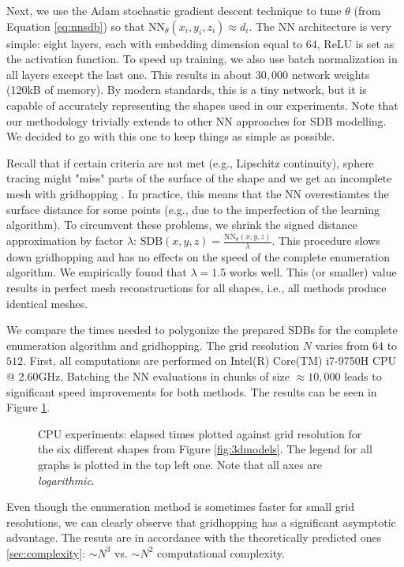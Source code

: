 \documentclass[11pt,twocolumn]{article}
\begin{document}
		Next, we use the Adam stochastic gradient descent technique to tune $\theta$ (from Equation \ref{eq:nnsdb}) so that $\text{NN}_\theta(x_i, y_i, z_i)\approx d_i$.
		The NN architecture is very simple: eight layers, each with embedding dimension equal to $64$, ReLU is set as the activation function.
		To speed up training, we also use batch normalization in all layers except the last one.
		This results in about $30,000$ network weights (120kB of memory).
		By modern standards, this is a tiny network, but it is capable of accurately representing the shapes used in our experiments.
		Note that our methodology trivially extends to other NN approaches for SDB modelling.
		We decided to go with this one to keep things as simple as possible.

		Recall that if certain criteria are not met (e.g., Lipschitz continuity),
		sphere tracing might "miss" parts of the surface of the shape and we get an incomplete mesh with gridhopping \cite{Hart94spheretracing}.
		In practice, this means that the NN overestiamtes the surface distance for some points
		(e.g., due to the imperfection of the learning algorithm).
		To circumvent these problems, we shrink the signed distance approximation by factor $\lambda$: $\text{SDB}(x, y, z)=\frac{\text{NN}_\theta(x, y, z)}{\lambda}$.
		This procedure slows down gridhopping and has no effects on the speed of the complete enumeration algorithm.
        We empirically found that $\lambda=1.5$ works well.
		This (or smaller) value results in perfect mesh reconstructions for all shapes, i.e., all methods produce identical meshes.

		We compare the times needed to polygonize the prepared SDBs for the complete enumeration algorithm and gridhopping.
		The grid resolution $N$ varies from $64$ to $512$.
		First, all computations are performed on Intel(R) Core(TM) i7-9750H CPU @ 2.60GHz.
		Batching the NN evaluations in chunks of size $\approx 10,000$ leads to significant speed improvements for both methods.
		The results can be seen in Figure \ref{fig:nnsdb-times-cpu}.
		\begin{figure}
			\centering
			\resizebox{1.0\textwidth}{!}
			{
			
			}
			\resizebox{1.0\textwidth}{!}
			{
			
			}
			\caption
			{
				CPU experiments: elapsed times plotted against grid resolution for the six different shapes from Figure \ref{fig:3dmodels}.
				The legend for all graphs is plotted in the top left one.
				Note that all axes are \textit{logarithmic}.
			}
			\label{fig:nnsdb-times-cpu}
		\end{figure}
		Even though the enumeration method is sometimes faster for small grid resolutions, we can clearly observe that gridhopping has a significant asymptotic advantage.
		The resuts are in accordance with the theoretically predicted ones \ref{sec:complexity}: $\sim N^3$ vs. $\sim N^2$ computational complexity.
\end{document}
